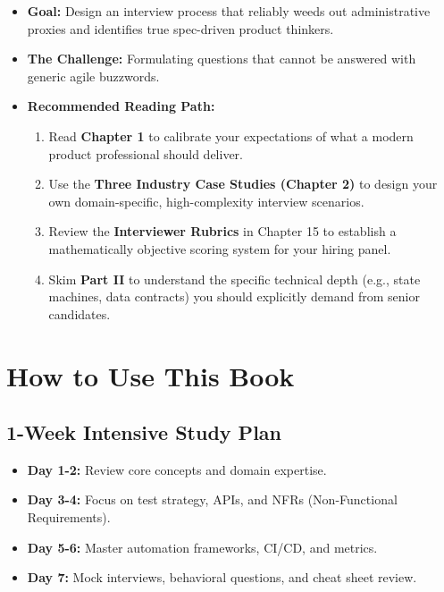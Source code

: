 \documentclass[
  11pt,
  openany,
  oneside]{book}
\providecommand{\tightlist}{%
  \setlength{\itemsep}{0pt}\setlength{\parskip}{0pt}}
\begin{document}
\begin{itemize}
\tightlist
\item
  \textbf{Goal:} Design an interview process that reliably weeds out
  administrative proxies and identifies true spec-driven product
  thinkers.
\item
  \textbf{The Challenge:} Formulating questions that cannot be answered
  with generic agile buzzwords.
\item
  \textbf{Recommended Reading Path:}

  \begin{enumerate}
  \def\labelenumi{\arabic{enumi}.}
  \tightlist
  \item
    Read \textbf{Chapter 1} to calibrate your expectations of what a
    modern product professional should deliver.
  \item
    Use the \textbf{Three Industry Case Studies (Chapter 2)} to design
    your own domain-specific, high-complexity interview scenarios.
  \item
    Review the \textbf{Interviewer Rubrics} in Chapter 15 to establish a
    mathematically objective scoring system for your hiring panel.
  \item
    Skim \textbf{Part II} to understand the specific technical depth
    (e.g., state machines, data contracts) you should explicitly demand
    from senior candidates.
  \end{enumerate}
\end{itemize}

\section{How to Use This Book}\label{how-to-use-this-book}

\subsection{1-Week Intensive Study
Plan}\label{week-intensive-study-plan}

\begin{itemize}
\tightlist
\item
  \textbf{Day 1-2:} Review core concepts and domain expertise.
\item
  \textbf{Day 3-4:} Focus on test strategy, APIs, and NFRs
  (Non-Functional Requirements).
\item
  \textbf{Day 5-6:} Master automation frameworks, CI/CD, and metrics.
\item
  \textbf{Day 7:} Mock interviews, behavioral questions, and cheat sheet
  review.
\end{itemize}
\end{document}
